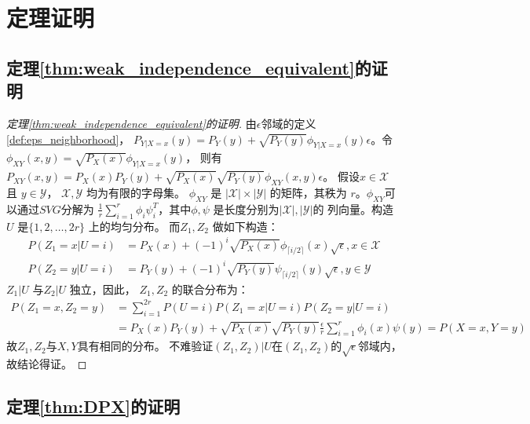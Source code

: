 
\section{定理证明}

\subsection{定理\ref{thm:weak_independence_equivalent}的证明}
\begin{proof}[定理\ref{thm:weak_independence_equivalent}的证明]
  由$\epsilon$邻域的定义\ref{def:eps_neighborhood}，
  $P_{Y|X=x}(y) = P_Y(y) + \sqrt{P_Y(y)}\phi_{Y|X=x}(y)
  \epsilon$。令$\phi_{XY}(x,y)=\sqrt{P_X(x)}\phi_{Y|X=x}(y)$，
  则有
  $P_{XY}(x,y) = P_X(x)P_Y(y) + \sqrt{P_X(x)}\sqrt{P_Y(y)}\phi_{XY}(x,y)
  \epsilon$。
  假设$x\in \mathcal{X}$ 且 $y\in \mathcal{Y}$，
  $\mathcal{X}, \mathcal{Y}$ 均为有限的字母集。
  $\phi_{XY}$ 是 $|\mathcal{X}| \times |\mathcal{Y}|$
  的矩阵，其秩为 $r$。$\phi_{XY}$可以通过$SVG$分解为
  $\frac{1}{r}\sum_{i=1}^r \phi_i \psi^T_i$，其中$\phi, \psi$
  是长度分别为$|\mathcal{X}|, |\mathcal{Y}|$的
  列向量。构造 $U$ 是$\{1, 2, \dots, 2r\}$ 上的均匀分布。
  而$Z_1, Z_2$ 做如下构造：
  \begin{align*}
    P(Z_1=x|U=i) &= P_X(x) + (-1)^i\sqrt{P_X(x)}\phi_{\lceil i/2 \rceil}(x) \sqrt{\epsilon}, x \in \mathcal{X} \\
    P(Z_2=y|U=i) &= P_Y(y) + (-1)^i\sqrt{P_Y(y)}\psi_{\lceil i/2 \rceil}(y) \sqrt{\epsilon}, y \in \mathcal{Y}
  \end{align*}
  $Z_1 | U$ 与$Z_2 | U$ 独立，因此，
  $Z_1, Z_2$ 的联合分布为：
  \begin{align*}
  P(Z_1=x, Z_2=y)& =\sum_{i=1}^{2r}P(U=i)P(Z_1=x|U=i)P(Z_2=y|U=i)\\
  &=P_X(x)P_Y(y) + \sqrt{P_X(x)}\sqrt{P_Y(y)}\frac{\epsilon}{r}
  \sum_{i=1}^{r}\phi_i(x)
  \psi(y) =P(X=x,Y=y)
  \end{align*}
  故$Z_1, Z_2$与$X,Y$具有相同的分布。
  不难验证$(Z_1, Z_2)|U$在$(Z_1, Z_2)$的$\sqrt{\epsilon}$邻域内，
  故结论得证。
  \end{proof}

\subsection{定理\ref{thm:DPX}的证明}


